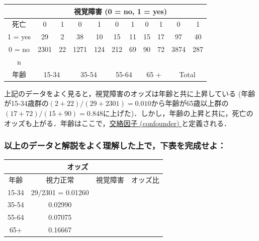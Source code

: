 \documentclass[11pt,]{problemset}
\begin{document}
\begin{center}
\begin{tabular}{|c|c|c|c|c|c|c|c|c|c|c|}
\hline
       & \multicolumn{10}{c|}{視覚障害 (0 = no, 1 = yes)}                                                                                                  \\ \hline
死亡     & 0             & 1          & 0            & 1           & 0            & 1           & 0           & 1           & 0            & 1           \\ \hline
1 = yes & 29            & 2          & 38           & 10          & 15           & 11          & 15          & 17          & 97           & 40          \\ \hline
0 = no & 2301          & 22         & 1271         & 124         & 212          & 69          & 90          & 72          & 3874         & 287         \\ \hline
  n     &           &           &          &          &           &           &           &           &          &          \\ \hline
年齢     & \multicolumn{2}{c|}{15-34} & \multicolumn{2}{c|}{35-54} & \multicolumn{2}{c|}{55-64} & \multicolumn{2}{c|}{65 +} & \multicolumn{2}{c|}{Total} \\ \hline
\end{tabular}
\end{center}

上記のデータをよく見ると，視覚障害のオッズは年齢と共に上昇している
(年齢が15-34歳群の\((2 + 22) / (29 + 2301) = 0.010\)から年齢が65歳以上群の\((17+72)/(15+90) = 0.848\)に上げた)．しかし，年齢の上昇と共に，死亡のオッズも上がる．年齢はここで，\underline{交絡因子 (confounder) }と定義される．

\subsubsection{以上のデータと解説をよく理解した上で，下表を完成せよ：}

\begin{center}
\begin{tabular}{|c|c|c|c|}
\hline
      & \multicolumn{2}{c|}{オッズ}    &        \\ \hline
年齢    & 視力正常              & 視覚障害    & オッズ比   \\ \hline
15-34 & 29/2301 = 0.01260 &   &   \\ \hline
35-54 & 0.02990           &  &  \\ \hline
55-64 & 0.07075           &  &  \\ \hline
65+   & 0.16667           &  &  \\ \hline
\end{tabular}
\end{center}
\end{document}
